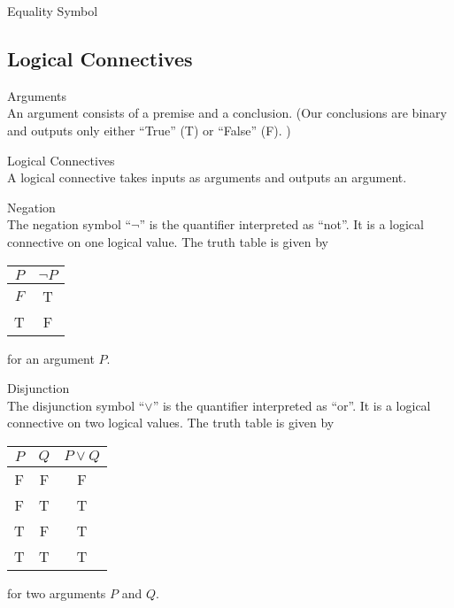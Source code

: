 \documentclass[a4paper]{article}
\begin{document}
\begin{defn}{Equality Symbol}{}
\end{defn}

\subsection{Logical Connectives}
\begin{defn}{Arguments}{}\\
An argument consists of a premise and a conclusion. (Our conclusions are binary and outputs only either ``True'' (T) or ``False'' (F). )
\end{defn}

\begin{defn}{Logical Connectives}{}\\
A logical connective takes inputs as arguments and outputs an argument. 
\end{defn}

\begin{defn}{Negation}{}\\
The negation symbol ``$\neg$'' is the quantifier interpreted as ``not''. It is a logical connective on one logical value. The truth table is given by 
\begin{center}
\begin{tabular}{c|c}
$P$ & $\neg P$ \\ \hline
$F$ & T        \\
T   & F       
\end{tabular}
\end{center}
for an argument $P$. 
\end{defn}

\begin{defn}{Disjunction}{}\\
The disjunction symbol ``$\vee$'' is the quantifier interpreted as ``or''. It is a logical connective on two logical values. The truth table is given by 
\begin{center}
\begin{tabular}{c|c|c}
$P$ & $Q$ & $P\vee Q$ \\ \hline
F   & F   & F        \\
F   & T   & T        \\
T   & F   & T        \\
T   & T   & T       
\end{tabular}
\end{center}
for two arguments $P$ and $Q$. 
\end{defn}
\end{document}
